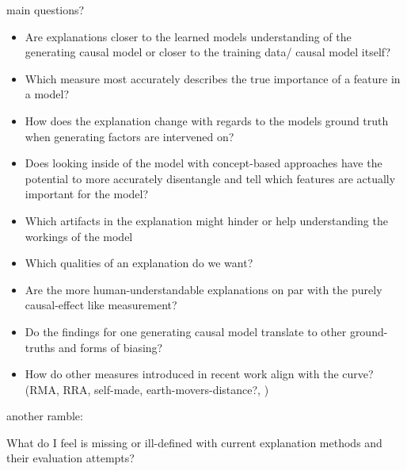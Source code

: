 {main questions?
\begin{itemize}
    \item Are explanations closer to the learned models understanding of the generating causal model or closer to the training data/ causal model itself?
    \item Which measure most accurately describes the true importance of a feature in a model?
    \item How does the explanation change with regards to the models ground truth when generating factors are intervened on?
    \item Does looking inside of the model with concept-based approaches have the potential to more accurately disentangle and tell which features are actually important for the model?
    \item Which artifacts in the explanation might hinder or help understanding the workings of the model
    \item Which qualities of an explanation do we want?
    \item Are the more human-understandable explanations on par with the purely causal-effect like measurement?
    \item Do the findings for one generating causal model translate to other ground-truths and forms of biasing?
    \item How do other measures introduced in recent work align with the curve? (RMA, RRA, self-made, earth-movers-distance?, )
\end{itemize}

another ramble:


What do I feel is missing or ill-defined with current explanation methods and their evaluation attempts?


}
